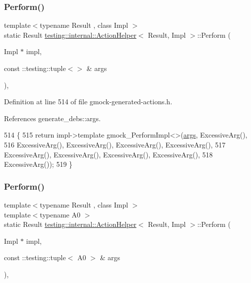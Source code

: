 \subsubsection{\texorpdfstring{Perform()}{Perform()}\hspace{0.1cm}{\footnotesize\ttfamily [1/11]}}
{\footnotesize\ttfamily template$<$typename Result , class Impl $>$ \\
static Result \hyperlink{classtesting_1_1internal_1_1ActionHelper}{testing\+::internal\+::\+Action\+Helper}$<$ Result, Impl $>$\+::Perform (\begin{DoxyParamCaption}\item[{Impl $\ast$}]{impl,  }\item[{const \+::testing\+::tuple$<$$>$ \&}]{args }\end{DoxyParamCaption})\hspace{0.3cm}{\ttfamily [inline]}, {\ttfamily [static]}}



Definition at line 514 of file gmock-\/generated-\/actions.\+h.



References generate\+\_\+debs\+::args.


\begin{DoxyCode}
514                                                                 \{
515     \textcolor{keywordflow}{return} impl->template gmock\_PerformImpl<>(\hyperlink{namespacegenerate__debs_a75f9143e38df82d83b2e8a6f99cae02c}{args}, ExcessiveArg(),
516         ExcessiveArg(), ExcessiveArg(), ExcessiveArg(), ExcessiveArg(),
517         ExcessiveArg(), ExcessiveArg(), ExcessiveArg(), ExcessiveArg(),
518         ExcessiveArg());
519   \}
\end{DoxyCode}
\mbox{\label{classtesting_1_1internal_1_1ActionHelper_a08d2e199b0a3a1f9e05982cae07db3ec}} 
\subsubsection{\texorpdfstring{Perform()}{Perform()}\hspace{0.1cm}{\footnotesize\ttfamily [2/11]}}
{\footnotesize\ttfamily template$<$typename Result , class Impl $>$ \\
template$<$typename A0 $>$ \\
static Result \hyperlink{classtesting_1_1internal_1_1ActionHelper}{testing\+::internal\+::\+Action\+Helper}$<$ Result, Impl $>$\+::Perform (\begin{DoxyParamCaption}\item[{Impl $\ast$}]{impl,  }\item[{const \+::testing\+::tuple$<$ A0 $>$ \&}]{args }\end{DoxyParamCaption})\hspace{0.3cm}{\ttfamily [inline]}, {\ttfamily [static]}}



